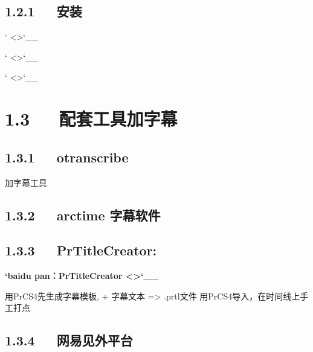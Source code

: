 \documentclass[letterpaper,12pt,english]{sphinxmanual}
\begin{document}
\subsection{1.2.1   安装}
\label{\detokenize{001software/001install/adobe:id1}}
` <>`\_\_

` <>`\_\_

` <>`\_\_


\section{1.3   配套工具\sphinxhyphen{}加字幕}
\label{\detokenize{001software/001install/adobe:id2}}

\subsection{1.3.1   otranscribe}
\label{\detokenize{001software/001install/adobe:otranscribe}}


加字幕工具



\subsection{1.3.2   arctime 字幕软件}
\label{\detokenize{001software/001install/adobe:arctime}}

\subsection{1.3.3   PrTitleCreator:}
\label{\detokenize{001software/001install/adobe:prtitlecreator}}
{\color{red}\bfseries{}`baidu pan：PrTitleCreator <>`\_\_}

用PrCS4先生成字幕模板, + 字幕文本 => .prtl文件 用PrCS4导入，在时间线上手工打点



\subsection{1.3.4   网易见外平台}
\label{\detokenize{001software/001install/adobe:id3}}
\end{document}
